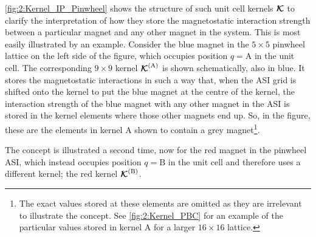 
\cref{fig:2:Kernel_IP_Pinwheel} shows the structure of such unit cell kernels $\boldsymbol{\mathbf{\mathcal{K}}}$ to clarify the interpretation of how they store the magnetostatic interaction strength between a particular magnet and any other magnet in the system.
This is most easily illustrated by an example.
Consider the blue magnet in the $5 \times 5$ pinwheel lattice on the left side of the figure, which occupies position $q=\mathrm{A}$ in the unit cell.
The corresponding $9 \times 9$ kernel $\boldsymbol{\mathbf{\mathcal{K}}}^\mathrm{(A)}$ is shown schematically, also in blue.
It stores the magnetostatic interactions in such a way that, when the ASI grid is shifted onto the kernel to put the blue magnet at the centre of the kernel, the interaction strength of the blue magnet with any other magnet in the ASI is stored in the kernel elements where those other magnets end up.
So, in the figure, these are the elements in kernel A shown to contain a grey magnet\footnote{
	The exact values stored at these elements are omitted as they are irrelevant to illustrate the concept. See \cref{fig:2:Kernel_PBC} for an example of the particular values stored in kernel A for a larger $16 \times 16$ lattice.
}. \par
The concept is illustrated a second time, now for the red magnet in the pinwheel ASI, which instead occupies position $q=\mathrm{B}$ in the unit cell and therefore uses a different kernel; the red kernel $\boldsymbol{\mathbf{\mathcal{K}}}^\mathrm{(B)}$. \\\par

